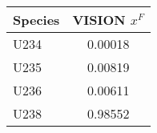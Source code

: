 \begin{tabular}{|l||c|}
\hline
\bf{Species} & \bf{VISION $x^F$} \\ 
\hline
U234 & 0.00018 \\ 
\hline
U235 & 0.00819 \\ 
\hline
U236 & 0.00611 \\ 
\hline
U238 & 0.98552 \\ 
\hline
\end{tabular}
